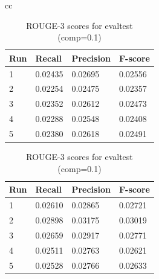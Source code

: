 \documentclass[11pt]{article}
\begin{document}
\begin{table}[!ht]
\begin{tabular}{cc}
\begin{minipage}{1.05\linewidth}
\centering
\caption*{ROUGE-3 scores for devtest (comp=0.1)}
\begin{tabular}{|l|l|l|l|}
\hline
Run   & Recall  & Precision & F-score \\ \hline
1 & 0.02435 & 0.02695   & 0.02556 \\ \hline
2 & 0.02254 & 0.02475   & 0.02357 \\ \hline
3 & 0.02352 & 0.02612   & 0.02473 \\ \hline
4 & 0.02288 & 0.02548   & 0.02408 \\ \hline
5 & 0.02380 & 0.02618   & 0.02491 \\ \hline
\end{tabular}
\end{minipage} 

\begin{minipage}{1.05\linewidth}
\centering
\caption*{ROUGE-3 scores for evaltest (comp=0.1)}
\begin{tabular}{|l|l|l|l|}
\hline
Run   & Recall  & Precision & F-score \\ \hline
1 & 0.02610 & 0.02865   & 0.02721 \\ \hline
2 & 0.02898 & 0.03175   & 0.03019 \\ \hline
3 & 0.02659 & 0.02917   & 0.02771 \\ \hline
4 & 0.02511 & 0.02763   & 0.02621 \\ \hline
5 & 0.02528 & 0.02766   & 0.02633 \\ \hline
\end{tabular}
\end{minipage}
\end{tabular}
\end{table}
\end{document}
